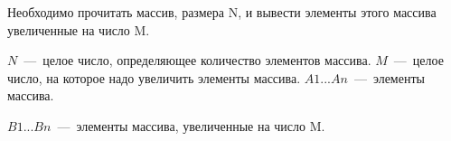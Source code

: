 Необходимо прочитать массив, размера N, и вывести элементы этого массива увеличенные на число M.

\InputFile

$N$~---~целое число, определяющее количество элементов массива.
$M$~---~целое число, на которое надо увеличить элементы массива.
$A1...An$~---~элементы массива. 
\OutputFile

$B1...Bn$~---~элементы массива, увеличенные на число M.

\SAMPLES
